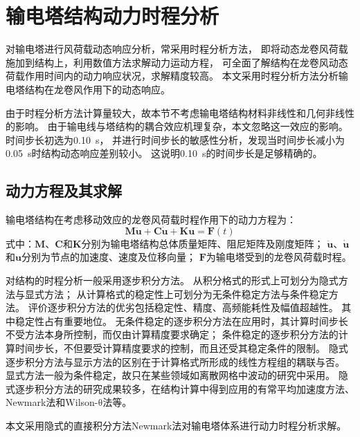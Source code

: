 \section{输电塔结构动力时程分析}

对输电塔进行风荷载动态响应分析，常采用时程分析方法，
即将动态龙卷风荷载施加到结构上，利用数值方法求解动力运动方程，
可全面了解结构在龙卷风动态荷载作用时间内的动力响应状况，求解精度较高。
本文采用时程分析方法分析输电塔结构在龙卷风作用下的动态响应。

由于时程分析方法计算量较大，故本节不考虑输电塔结构材料非线性和几何非线性的影响。
由于输电线与塔结构的耦合效应机理复杂，本文忽略这一效应的影响。
时间步长初选为\SI{0.10}{s}，
并进行时间步长的敏感性分析，发现当时间步长减小为\SI{0.05}{s}时结构动态响应差别较小。
这说明\SI{0.10}{s}的时间步长是足够精确的。

\subsection{动力方程及其求解}

输电塔结构在考虑移动效应的龙卷风荷载时程作用下的动力方程为：
\begin{equation}\label{eqn:dynamic}
    \bm{M}\ddot{\bm{u}}+\bm{C}\dot{\bm{u}}+\bm{K}\bm{u} = \bm{F}(t)
\end{equation}
式中：$\bm{M}$、$\bm{C}$和$\bm{K}$分别为输电塔结构总体质量矩阵、阻尼矩阵及刚度矩阵；
$\ddot{\bm{u}}$、$\dot{\bm{u}}$和$\bm{u}$分别为节点的加速度、速度及位移向量；
$\bm{F}$为输电塔受到的龙卷风荷载时程。

对结构的时程分析一般采用逐步积分方法。
从积分格式的形式上可划分为隐式方法与显式方法；
从计算格式的稳定性上可划分为无条件稳定方法与条件稳定方法。
评价逐步积分方法的优劣包括稳定性、精度、高频能耗性及幅值超越性。
其中稳定性占有重要地位。
无条件稳定的逐步积分方法在应用时，其计算时间步长不受方法本身所控制，而仅由计算精度要求确定；
条件稳定的逐步积分方法的计算时间步长，不但要受计算精度要求的控制，而且还受其稳定条件的限制。
隐式逐步积分方法与显示方法的区别在于计算格式所形成的线性方程组的耦联与否。
显式方法一般为条件稳定，故只在某些领域如离散网格中波动的研究中采用。
隐式逐步积分方法的研究成果较多，在结构计算中得到应用的有常平均加速度方法、Newmark法和Wilson-$\mathrm{\theta}$法等。

本文采用隐式的直接积分方法Newmark法对输电塔体系进行动力时程分析求解。


